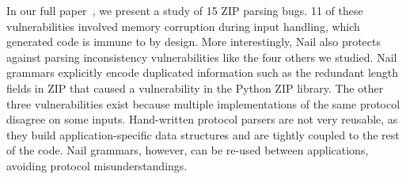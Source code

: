 In our full paper~\cite{bangert:nail-osdi14}, we present a study of 15 ZIP parsing bugs.
11 of these vulnerabilities involved memory corruption during input handling, which generated code
is immune to by design.
More interestingly, Nail also protects against parsing inconsistency vulnerabilities like the four others we studied.
Nail grammars explicitly encode duplicated information such as the redundant length fields in ZIP
that caused a vulnerability in the Python ZIP library. The other three vulnerabilities exist
because multiple implementations of the same protocol disagree on some inputs. Hand-written protocol
parsers are not very reusable, as they build application-specific data structures and are tightly
coupled to the rest of the code. Nail grammars, however, can be re-used between applications,
avoiding protocol misunderstandings.



